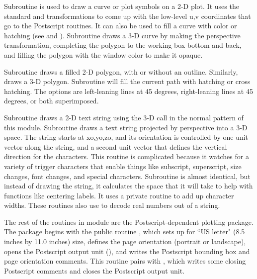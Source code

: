 Subroutine 
is used to draw a curve or plot symbols on
a 2-D plot.  It uses the standard  and 
transformations to come up with the low-level u,v coordinates that
go to the Postscript routines.  It can also be used to fill a curve
with color or hatching (see 
and ).
Subroutine 
draws a 3-D curve by making the perspective transformation,
completing the polygon to the working box bottom and back,
and filling the polygon with the window color to make it opaque.

Subroutine  draws a
filled 2-D polygon, with or without an outline.  Similarly,
 draws a 3-D polygon.
Subroutine  will fill the current path with hatching or
cross hatching.  The options are left-leaning lines at 45 degrees,
right-leaning lines at 45 degrees, or both superimposed.

Subroutine 
draws a 2-D text string using the 3-D call
in the normal pattern of this module. Subroutine
 draws
a text string projected by perspective into a 3-D space.  The string
starts at xo,yo,zo, and its orientation is controlled by one unit
vector along the string, and a second unit vector that defines the
vertical direction for the characters.  This routine is complicated
because it watches for a variety of trigger characters that enable
things like subscript, superscript, size changes, font changes, and
special characters.  Subroutine 
is almost identical, but instead of drawing the string, it calculates
the space that it will take to help with functions like centering
labels.  It uses a private routine 
to add up character widths.  These routines also use
 to decode real numbers
out of a string.

The rest of the routines in module  are the
Postscript-dependent plotting package.  The package begins with the
public routine , which
sets up for ``US letter" (8.5 inches by 11.0 inches) size, defines
the page orientation
(portrait or landscape), opens the Postscript output unit
(), and writes the Postscript bounding box and
page orientation comments.  This routine pairs with
, which writes some closing
Postscript comments and closes the Postscript output unit.


